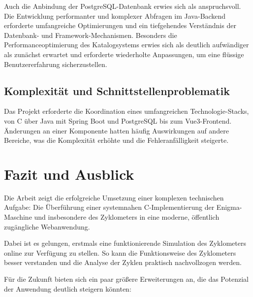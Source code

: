 \documentclass[12pt, ngerman, a4paper, numbers=noenddot]{article}
\begin{document}
Auch die Anbindung der PostgreSQL-Datenbank erwies sich als anspruchsvoll. Die Entwicklung performanter und komplexer Abfragen im Java-Backend erforderte umfangreiche Optimierungen und ein tiefgehendes Verständnis der Datenbank- und Framework-Mechanismen. Besonders die Performanceoptimierung des Katalogsystems erwies sich als deutlich aufwändiger als zunächst erwartet und erforderte wiederholte Anpassungen, um eine flüssige Benutzererfahrung sicherzustellen.


\subsection{Komplexität und Schnittstellenproblematik}

Das Projekt erforderte die Koordination eines umfangreichen Technologie-Stacks, von C über Java mit Spring Boot und PostgreSQL bis zum Vue3-Frontend. Änderungen an einer Komponente hatten häufig Auswirkungen auf andere Bereiche, was die Komplexität erhöhte und die Fehleranfälligkeit steigerte.


\newpage
\section{Fazit und Ausblick}

Die Arbeit zeigt die erfolgreiche Umsetzung einer komplexen technischen Aufgabe: Die Überführung einer systemnahen C\hyp{}Implementierung der Enigma-Maschine und insbesondere des Zyklometers in eine moderne, öffentlich zugängliche Webanwendung.

Dabei ist es gelungen, erstmals eine funktionierende Simulation des Zyklometers online zur Verfügung zu stellen. So kann die Funktionsweise des Zyklometers besser verstanden und die Analyse der Zyklen praktisch nachvollzogen werden.

Für die Zukunft bieten sich ein paar größere Erweiterungen an, die das Potenzial der Anwendung deutlich steigern könnten:
\end{document}
